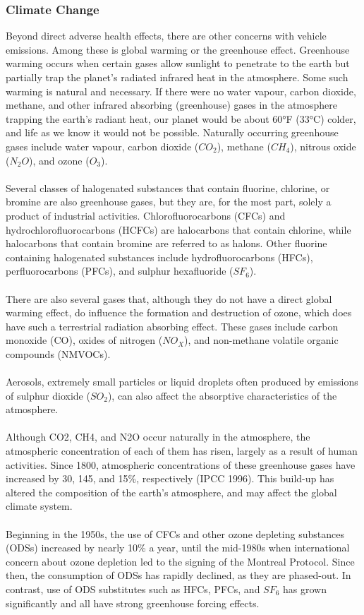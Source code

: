 \subsubsection{Climate Change}
Beyond direct adverse health effects, there are other concerns with vehicle emissions. Among these is global warming or the greenhouse effect. Greenhouse warming occurs when certain gases allow sunlight to penetrate to the earth but partially trap the planet's radiated infrared heat in the atmosphere. Some such warming is natural and necessary. If there were no water vapour, carbon dioxide, methane, and other infrared absorbing (greenhouse) gases in the atmosphere trapping the earth's radiant heat, our planet would be about 60°F (33°C) colder, and life as we know it would not be possible. Naturally occurring greenhouse gases include water vapour, carbon dioxide ($ CO_2 $), methane ($ CH_4 $), nitrous oxide ($ N_2O $), and ozone ($ O_3 $).\\\\
Several classes of halogenated substances that contain fluorine, chlorine, or bromine are also greenhouse gases, but they are, for the most part,
solely a product of industrial activities. Chlorofluorocarbons (CFCs) and hydrochlorofluorocarbons (HCFCs) are halocarbons that contain chlorine, while halocarbons that contain bromine are referred to as halons. Other fluorine containing halogenated substances include hydrofluorocarbons (HFCs), perfluorocarbons (PFCs), and sulphur hexafluoride ($ SF_6 $).\\\\
There are also several gases that, although they do not have a direct global warming effect, do influence the formation and destruction of ozone, which does have such a terrestrial radiation absorbing effect. These gases include carbon monoxide (CO), oxides of nitrogen ($ NO_X $), and non-methane volatile organic compounds (NMVOCs).\\\\
Aerosols, extremely small particles or liquid droplets often produced by emissions of sulphur dioxide ($ SO_2 $), can also affect the absorptive characteristics of the atmosphere.\\\\
Although CO2, CH4, and N2O occur naturally in the atmosphere, the atmospheric concentration of
each of them has risen, largely as a result of human activities. Since 1800, atmospheric concentrations of these greenhouse gases have increased by 30, 145, and 15\%, respectively (IPCC 1996). This build-up has altered the composition of the earth’s atmosphere, and may affect the global climate system.\\\\
Beginning in the 1950s, the use of CFCs and other ozone depleting substances (ODSs) increased
by nearly 10\% a year, until the mid-1980s when international concern about ozone depletion led to the signing of the Montreal Protocol. Since then, the consumption of ODSs has rapidly declined, as they are phased-out.
In contrast, use of ODS substitutes such as HFCs, PFCs, and $ SF_6 $ has grown
significantly and all have strong greenhouse forcing effects.
